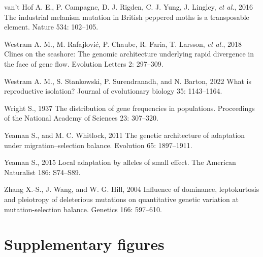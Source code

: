 \documentclass[
  11pt,
]{article}
\newlength{\cslhangindent}
\newlength{\cslentryspacingunit} %
\newenvironment{CSLReferences}[2] %
 {%
  \setlength{\parindent}{0pt}
  \ifodd #1
  \let\oldpar\par
  \def\par{\hangindent=\cslhangindent\oldpar}
  \fi
  \setlength{\parskip}{#2\cslentryspacingunit}
 }%
 {}
\begin{document}
\begin{CSLReferences}{1}{0}
\leavevmode{}%
van't Hof A. E., P. Campagne, D. J. Rigden, C. J. Yung, J. Lingley,
\emph{et al.}, 2016 The industrial melanism mutation in {British}
peppered moths is a transposable element. Nature 534: 102--105.

\leavevmode{}%
Westram A. M., M. Rafajlović, P. Chaube, R. Faria, T. Larsson, \emph{et
al.}, 2018 Clines on the seashore: The genomic architecture underlying
rapid divergence in the face of gene flow. Evolution Letters 2:
297--309.

\leavevmode{}%
Westram A. M., S. Stankowski, P. Surendranadh, and N. Barton, 2022 What
is reproductive isolation? Journal of evolutionary biology 35:
1143--1164.

\leavevmode{}%
Wright S., 1937 The distribution of gene frequencies in populations.
Proceedings of the National Academy of Sciences 23: 307--320.

\leavevmode{}%
Yeaman S., and M. C. Whitlock, 2011 The genetic architecture of
adaptation under migration--selection balance. Evolution 65: 1897--1911.

\leavevmode{}%
Yeaman S., 2015 Local adaptation by alleles of small effect. The
American Naturalist 186: S74--S89.

\leavevmode{}%
Zhang X.-S., J. Wang, and W. G. Hill, 2004 Influence of dominance,
leptokurtosis and pleiotropy of deleterious mutations on quantitative
genetic variation at mutation-selection balance. Genetics 166: 597--610.

\end{CSLReferences}

\clearpage
\setcounter{page}{1}

\clearpage
\renewcommand{\thefigure}{S\arabic{figure}}
\renewcommand{\thesection}{S\arabic{section}}
\renewcommand{\thealgorithm}{S\arabic{algorithm}}
\setcounter{figure}{0}
\setcounter{section}{0}
\setcounter{equation}{0}
\setcounter{algorithm}{0}

\hypertarget{supplementary-figures}{%
\section{Supplementary figures}\label{supplementary-figures}}

\clearpage
\end{document}

